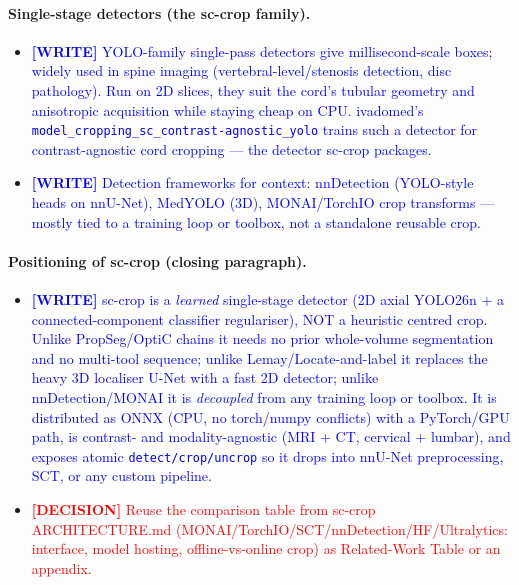\documentclass[11pt]{article}
\newcommand{\WRITE}[1]{\textcolor{blue}{\textbf{[WRITE]} #1}}
\newcommand{\DECISION}[1]{\textcolor{red}{\textbf{[DECISION]} #1}}
\begin{document}
\paragraph{Single-stage detectors (the sc-crop family).}
\begin{itemize}
  \item \WRITE{YOLO-family single-pass detectors give millisecond-scale boxes;
        widely used in spine imaging (vertebral-level/stenosis detection, disc
        pathology). Run on 2D slices, they suit the cord's tubular geometry and
        anisotropic acquisition while staying cheap on CPU. ivadomed's
        \texttt{model\_cropping\_sc\_contrast-agnostic\_yolo} trains such a
        detector for contrast-agnostic cord cropping --- the detector sc-crop
        packages.}
  \item \WRITE{Detection frameworks for context: nnDetection (YOLO-style heads
        on nnU-Net), MedYOLO (3D), MONAI/TorchIO crop transforms --- mostly
        tied to a training loop or toolbox, not a standalone reusable crop.}
\end{itemize}

\paragraph{Positioning of sc-crop (closing paragraph).}
\begin{itemize}
  \item \WRITE{sc-crop is a \emph{learned} single-stage detector (2D axial
        YOLO26n + a connected-component classifier regulariser), NOT a heuristic
        centred crop. Unlike PropSeg/OptiC chains it needs no prior whole-volume
        segmentation and no multi-tool sequence; unlike Lemay/Locate-and-label it
        replaces the heavy 3D localiser U-Net with a fast 2D detector; unlike
        nnDetection/MONAI it is \emph{decoupled} from any training loop or
        toolbox. It is distributed as ONNX (CPU, no torch/numpy conflicts) with
        a PyTorch/GPU path, is contrast- and modality-agnostic (MRI + CT,
        cervical + lumbar), and exposes atomic \texttt{detect/crop/uncrop} so it
        drops into nnU-Net preprocessing, SCT, or any custom pipeline.}
  \item \DECISION{Reuse the comparison table from sc-crop ARCHITECTURE.md
        (MONAI/TorchIO/SCT/nnDetection/HF/Ultralytics: interface, model hosting,
        offline-vs-online crop) as Related-Work Table or an appendix.}
\end{itemize}
\end{document}
